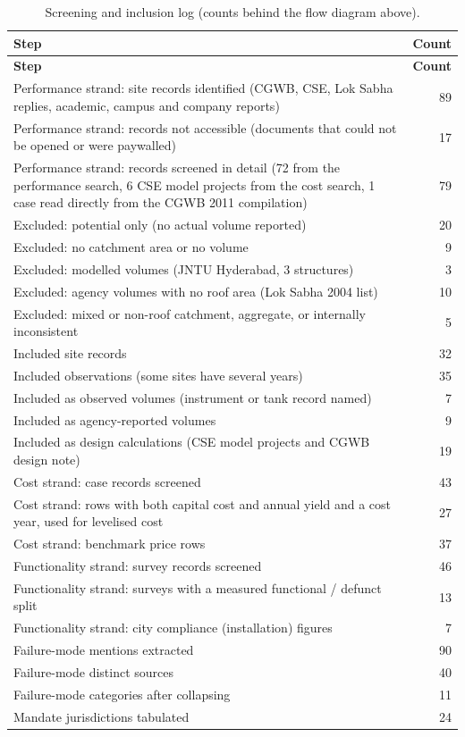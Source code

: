 {\scriptsize\setlength{\tabcolsep}{3pt}
\begin{longtable}{p{13cm} r}
\caption{Screening and inclusion log (counts behind the flow diagram above).}\label{tab:screen}\\
\toprule
\textbf{Step} & \textbf{Count}\\ \midrule\endfirsthead
\toprule \textbf{Step} & \textbf{Count}\\ \midrule\endhead
\bottomrule\endfoot
Performance strand: site records identified (CGWB, CSE, Lok Sabha replies, academic, campus and company reports) & 89\\
Performance strand: records not accessible (documents that could not be opened or were paywalled) & 17\\
Performance strand: records screened in detail (72 from the performance search, 6 CSE model projects from the cost search, 1 case read directly from the CGWB 2011 compilation) & 79\\
Excluded: potential only (no actual volume reported) & 20\\
Excluded: no catchment area or no volume & 9\\
Excluded: modelled volumes (JNTU Hyderabad, 3 structures) & 3\\
Excluded: agency volumes with no roof area (Lok Sabha 2004 list) & 10\\
Excluded: mixed or non-roof catchment, aggregate, or internally inconsistent & 5\\
Included site records & 32\\
Included observations (some sites have several years) & 35\\
Included as observed volumes (instrument or tank record named) & 7\\
Included as agency-reported volumes & 9\\
Included as design calculations (CSE model projects and CGWB design note) & 19\\
Cost strand: case records screened & 43\\
Cost strand: rows with both capital cost and annual yield and a cost year, used for levelised cost & 27\\
Cost strand: benchmark price rows & 37\\
Functionality strand: survey records screened & 46\\
Functionality strand: surveys with a measured functional / defunct split & 13\\
Functionality strand: city compliance (installation) figures & 7\\
Failure-mode mentions extracted & 90\\
Failure-mode distinct sources & 40\\
Failure-mode categories after collapsing & 11\\
Mandate jurisdictions tabulated & 24\\
\end{longtable}}
